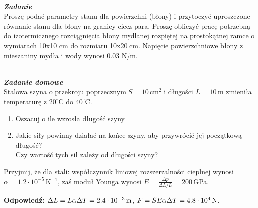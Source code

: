 \documentclass[11pt,a4paper]{article}
\newcounter{zadanie}\newcommand{\zadanie}[1][]{\addtocounter{zadanie}{1} ~\\  {\bf \emph{Zadanie \arabic{zadanie} #1 }} \\}
\newcounter{zaddom}\newcommand{\zaddom}[1][]{\addtocounter{zaddom}{1} ~\\  {\bf \emph{Zadanie domowe \arabic{zaddom} #1 }} \\}
\begin{document}
\zadanie

Proszę podać parametry stanu dla powierzchni (błony) i przytoczyć
uproszczone równanie stanu dla błony na granicy ciecz-para.
Proszę obliczyć pracę potrzebną do izotermicznego rozciągnięcia błony mydlanej 
rozpiętej na prostokątnej ramce o wymiarach 10x10 cm
do rozmiaru 10x20 cm. Napięcie powierzchniowe błony z 
mieszaniny mydła i wody wynosi 0.03 N/m.


\vspace{5cm}

\zaddom
Stalowa szyna o przekroju poprzecznym $S = 10\,$cm$^2$ i długości $L = 10\,$m zmieniła temperaturę
z $20^\circ$C do $40^\circ$C.
\begin{enumerate}
\item Oszacuj o ile wzrosła długość szyny
\item Jakie siły powinny działać na końce szyny, aby przywrócić jej początkową długość? \\
      Czy wartość tych sił zależy od długości szyny?
\end{enumerate}
Przyjmij, że dla stali: współczynnik liniowej rozszerzalności cieplnej wynosi $\alpha = 1.2\cdot 10^{-5}\,$K$^{-1}$,
zaś moduł Younga wynosi $\displaystyle E = \frac{\Delta p}{\Delta L/L} = 200\,$GPa.

\vskip 10pt
\textbf{Odpowiedź:} $\Delta L = L \alpha \Delta T = 2.4 \cdot 10^{-3}\, {\rm m}$, $F = S E \alpha \Delta T = 4.8 \cdot 10^4\, {\rm N}$.
\end{document}
